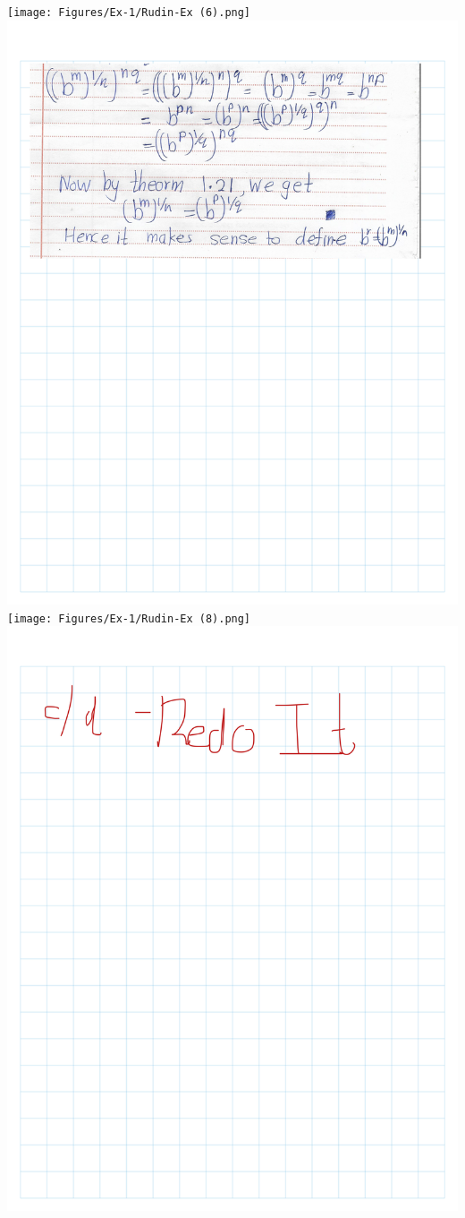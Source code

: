 \documentclass[
]{book}
\theoremstyle{definition}
\theoremstyle{definition}
\theoremstyle{definition}
\theoremstyle{definition}
\theoremstyle{remark}
\begin{document}
\texttt{[image: Figures/Ex-1/Rudin-Ex (6).png]}
\includegraphics{Figures/Ex-1/Rudin-Ex (7).png}
\texttt{[image: Figures/Ex-1/Rudin-Ex (8).png]}
\includegraphics{Figures/Ex-1/Rudin-Ex (9).png}
\end{document}
